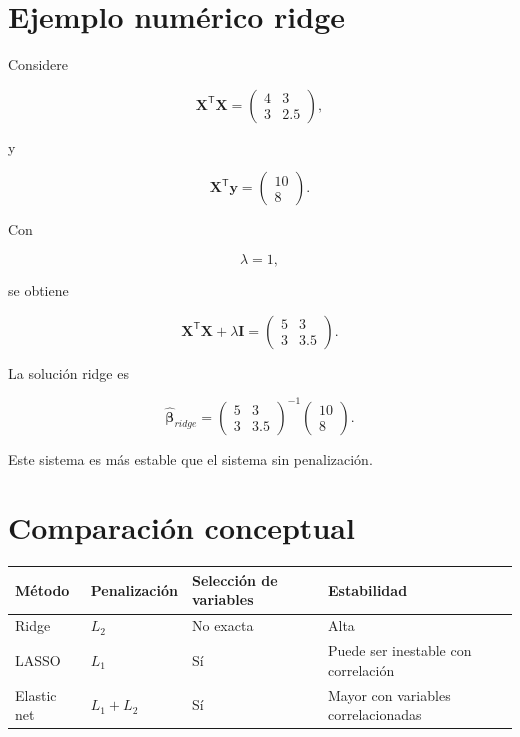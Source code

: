 \documentclass[
  spanish,
  11pt,
  letterpaper,
  DIV=11,
  numbers=noendperiod]{scrreprt}
\newcounter{none} %
\theoremstyle{definition}
\theoremstyle{plain}
\theoremstyle{definition}
\theoremstyle{remark}
\begin{document}
\section{Ejemplo numérico ridge}\label{ejemplo-numuxe9rico-ridge}

Considere

\[
\mathbf{X}^{\mathsf T}\mathbf{X}
=
\begin{pmatrix}
4 & 3\\
3 & 2.5
\end{pmatrix},
\]

y

\[
\mathbf{X}^{\mathsf T}\mathbf{y}
=
\begin{pmatrix}
10\\
8
\end{pmatrix}.
\]

Con

\[
\lambda=1,
\]

se obtiene

\[
\mathbf{X}^{\mathsf T}\mathbf{X}
+
\lambda\mathbf{I}
=
\begin{pmatrix}
5 & 3\\
3 & 3.5
\end{pmatrix}.
\]

La solución ridge es

\[
\widehat{\boldsymbol{\beta}}_{ridge}
=
\begin{pmatrix}
5 & 3\\
3 & 3.5
\end{pmatrix}^{-1}
\begin{pmatrix}
10\\
8
\end{pmatrix}.
\]

Este sistema es más estable que el sistema sin penalización.

\section{Comparación conceptual}\label{comparaciuxf3n-conceptual}

{\def\LTcaptype{none} %
\begin{longtable}[]{@{}llll@{}}
\toprule\noalign{}
Método & Penalización & Selección de variables & Estabilidad \\
\midrule\noalign{}
\endhead
\bottomrule\noalign{}
\endlastfoot
Ridge & \(L_2\) & No exacta & Alta \\
LASSO & \(L_1\) & Sí & Puede ser inestable con correlación \\
Elastic net & \(L_1+L_2\) & Sí & Mayor con variables correlacionadas \\
\end{longtable}
}
\end{document}
